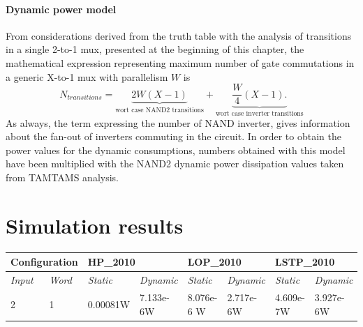 \paragraph{Dynamic power model}
From considerations derived from the truth table with the analysis of transitions in a single 2-to-1 mux, presented at the beginning of this chapter, the mathematical expression representing maximum number of gate commutations in a generic X-to-1 mux with parallelism $W$ is 
\begin{equation}
N_{transitions} = \underbrace{2 W \left( X-1 \right)}_\text{wort case NAND2 transitions}   + \underbrace{\frac{W}{4}\left( X-1\right) .}_\text{wort case inverter transitions}
\end{equation}
As always, the term expressing the number of NAND inverter, gives information about the fan-out of inverters commuting in the circuit.
In order to  obtain the power values for the dynamic consumptions, numbers obtained with this model have been multiplied with the NAND2 dynamic power dissipation values taken from TAMTAMS analysis.
\newpage

\section{Simulation results}
\begin{table}[b!]
\centering
\label{my-label}
\begin{tabular}{@{}llllllll@{}}
\toprule
\multicolumn{2}{l}{\textbf{Configuration}} & \multicolumn{2}{l}{\textbf{HP\_2010}} & \multicolumn{2}{l}{\textbf{LOP\_2010}} & \multicolumn{2}{l}{\textbf{LSTP\_2010}} \\ \midrule
\textit{Input}         & \textit{Word}        & \textit{Static}   & \textit{Dynamic}  & \textit{Static}   & \textit{Dynamic}   & \textit{Static}    & \textit{Dynamic}   \\
2                      & 1                 & 0.00081W           & 7.133e-6W          & 8.076e-6 W         & 2.717e-6W           & 4.609e-7W           & 3.927e-6W          
\end{tabular}
\end{table}


